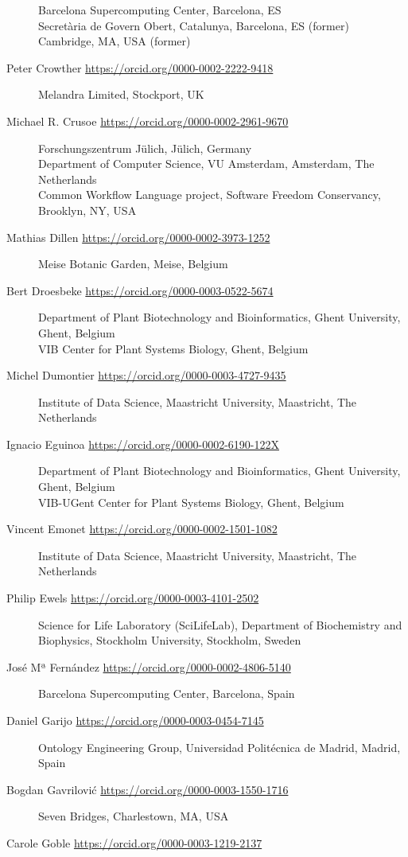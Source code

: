 \begin{description}
Barcelona Supercomputing Center, Barcelona, ES\\
Secretària de Govern Obert, Catalunya, Barcelona, ES (former)
Cambridge, MA, USA (former)\\
\item[Peter Crowther \url{https://orcid.org/0000-0002-2222-9418}]
Melandra Limited, Stockport, UK
\item[Michael R. Crusoe \url{https://orcid.org/0000-0002-2961-9670}]
Forschungszentrum Jülich, Jülich, Germany\\
Department of Computer Science, VU Amsterdam, Amsterdam, The Netherlands\\
Common Workflow Language project, Software Freedom Conservancy,
Brooklyn, NY, USA
\item[Mathias Dillen \url{https://orcid.org/0000-0002-3973-1252}]
Meise Botanic Garden, Meise, Belgium
\item[Bert Droesbeke \url{https://orcid.org/0000-0003-0522-5674}]
Department of Plant Biotechnology and Bioinformatics, Ghent University,
Ghent, Belgium\\
VIB Center for Plant Systems Biology, Ghent, Belgium
\item[Michel Dumontier \url{https://orcid.org/0000-0003-4727-9435}]
Institute of Data Science, Maastricht University, Maastricht, The
Netherlands
\item[Ignacio Eguinoa \url{https://orcid.org/0000-0002-6190-122X}]
Department of Plant Biotechnology and Bioinformatics, Ghent University,
Ghent, Belgium\\
VIB-UGent Center for Plant Systems Biology, Ghent, Belgium
\item[Vincent Emonet \url{https://orcid.org/0000-0002-1501-1082}]
Institute of Data Science, Maastricht University, Maastricht, The
Netherlands
\item[Philip Ewels \url{https://orcid.org/0000-0003-4101-2502}]
Science for Life Laboratory (SciLifeLab), Department of Biochemistry and
Biophysics, Stockholm University, Stockholm, Sweden
\item[José Mª Fernández \url{https://orcid.org/0000-0002-4806-5140}]
Barcelona Supercomputing Center, Barcelona, Spain
\item[Daniel Garijo \url{https://orcid.org/0000-0003-0454-7145}]
Ontology Engineering Group, Universidad Politécnica de Madrid, Madrid,
Spain
\item[Bogdan Gavrilović \url{https://orcid.org/0000-0003-1550-1716}]
Seven Bridges, Charlestown, MA, USA
\item[Carole Goble \url{https://orcid.org/0000-0003-1219-2137}]

\end{description}
